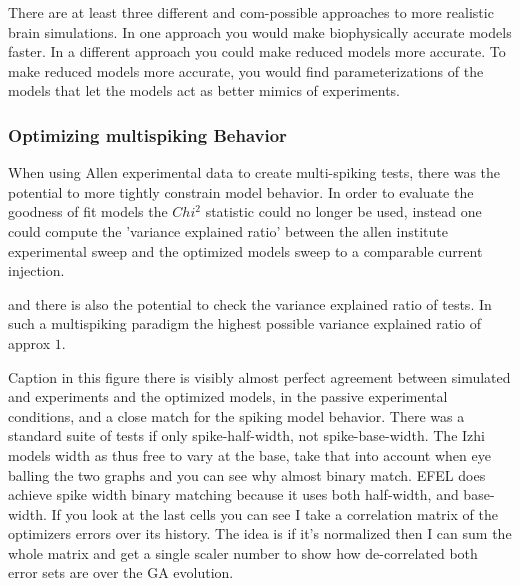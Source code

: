 There are at least three different and com-possible approaches to more realistic brain simulations. In one approach you would make biophysically accurate models faster. In a different approach you could make reduced models more accurate. To make reduced models more accurate, you would find parameterizations of the models that let the models act as better mimics of experiments.

\subsubsection{Optimizing multispiking Behavior}

When using Allen experimental data to create multi-spiking tests, there was the potential to more tightly constrain model behavior. In order to evaluate the goodness of fit models the $Chi^{2}$ statistic could no longer be used, instead one could compute the 'variance explained ratio' between the allen institute experimental sweep and the optimized models sweep to a comparable current injection.

and there is also the potential to check the variance explained ratio of tests.
In such a multispiking paradigm the highest possible variance explained ratio of approx $1$. 

Caption in this figure there is visibly almost perfect  agreement between simulated and experiments and the optimized models, in the passive experimental conditions, and a close match for the spiking model behavior. There was a standard suite of tests if only spike-half-width, not spike-base-width. The Izhi models width as thus free to vary at the base, take that into account when eye balling the two graphs and you can see why almost binary match. EFEL does achieve spike width binary matching because it uses both half-width, and base-width. If you look at the last cells you can see I take a correlation matrix of the optimizers errors over its history. The idea is if it's normalized then I can sum the whole matrix and get a single scaler number to show how de-correlated both error sets are over the GA evolution. 

